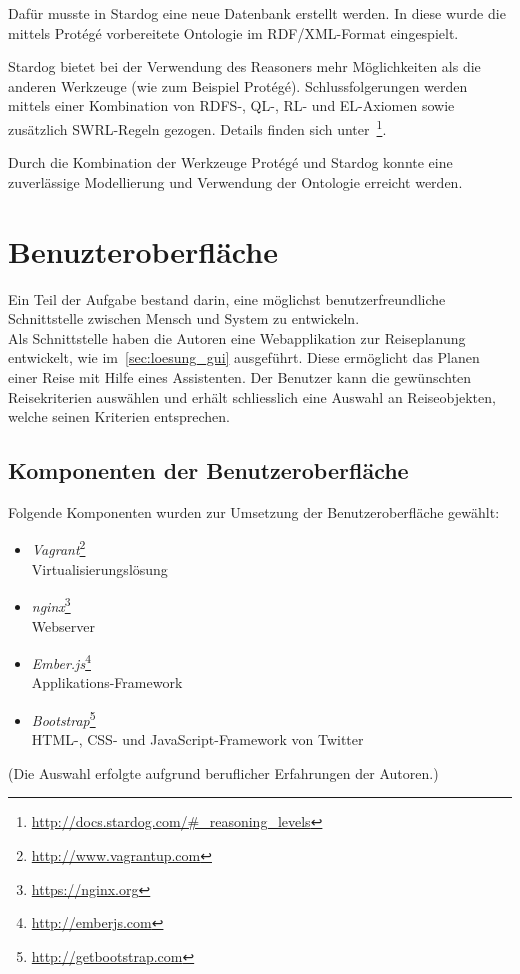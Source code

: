 Dafür musste in Stardog eine neue Datenbank erstellt werden. In diese wurde die mittels Protégé vorbereitete Ontologie im RDF/XML-Format eingespielt.

Stardog bietet bei der Verwendung des Reasoners mehr Möglichkeiten als die anderen Werkzeuge (wie zum Beispiel Protégé). Schlussfolgerungen werden mittels einer Kombination von RDFS-, QL-, RL- und EL-Axiomen sowie zusätzlich SWRL-Regeln gezogen. Details finden sich unter~\footnote{\url{http://docs.stardog.com/\#_reasoning_levels}}.


Durch die Kombination der Werkzeuge Protégé und Stardog konnte eine zuverlässige Modellierung und Verwendung der Ontologie erreicht werden.

\section{Benuzteroberfläche}
\label{sec:komponenten:ember}
Ein Teil der Aufgabe bestand darin, eine möglichst benutzerfreundliche Schnittstelle zwischen Mensch und System zu entwickeln.\\
Als Schnittstelle haben die Autoren eine Webapplikation zur Reiseplanung entwickelt, wie im~\autoref{sec:loesung_gui} ausgeführt. Diese ermöglicht das Planen einer Reise mit Hilfe eines Assistenten. Der Benutzer kann die gewünschten Reisekriterien auswählen und erhält schliesslich eine Auswahl an Reiseobjekten, welche seinen Kriterien entsprechen.

\subsection{Komponenten der Benutzeroberfläche}
\label{subsec:komponenten:gui:komponenten}
Folgende Komponenten wurden zur Umsetzung der Benutzeroberfläche gewählt:
\begin{itemize}
    \item \textit{Vagrant}\footnote{\url{http://www.vagrantup.com}}\\
        Virtualisierungslösung
    \item \textit{nginx}\footnote{\url{https://nginx.org}}\\
        Webserver
    \item \textit{Ember.js}\footnote{\url{http://emberjs.com}}\\
        Applikations-Framework
    \item \textit{Bootstrap}\footnote{\url{http://getbootstrap.com}}\\
        HTML-, CSS- und JavaScript-Framework von Twitter
\end{itemize}
(Die Auswahl erfolgte aufgrund beruflicher Erfahrungen der Autoren.)

